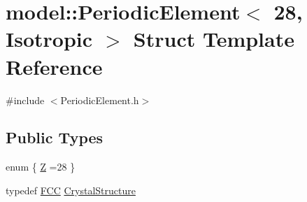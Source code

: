 \hypertarget{structmodel_1_1_periodic_element_3_0128_00_01_isotropic_01_4}{}\section{model\+:\+:Periodic\+Element$<$ 28, Isotropic $>$ Struct Template Reference}
\label{structmodel_1_1_periodic_element_3_0128_00_01_isotropic_01_4}


{\ttfamily \#include $<$Periodic\+Element.\+h$>$}

\subsection*{Public Types}
\begin{DoxyCompactItemize}
\item 
enum \{ \hyperlink{structmodel_1_1_periodic_element_3_0128_00_01_isotropic_01_4_af4f4464de50c3d753543912da4365bbca6c89fa49cf1841478038f471c626f34e}{Z} =28
 \}
\item 
typedef \hyperlink{structmodel_1_1_f_c_c}{F\+C\+C} \hyperlink{structmodel_1_1_periodic_element_3_0128_00_01_isotropic_01_4_af4d718e2f161df603099c24b762944b9}{Crystal\+Structure}
\end{DoxyCompactItemize}
